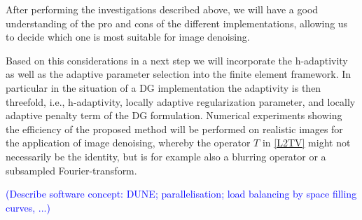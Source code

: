 \documentclass[enabledeprecatedfontcommands,cleardoublepage=empty,headsepline,twoside,11pt,DIV=15,BCOR=12mm,final]{scrartcl}
\begin{document}
  After performing the investigations described above, we will have a good understanding of the pro and cons of the different implementations, allowing us to decide which one is most suitable for image denoising. 

Based on this considerations in a next step we will incorporate the h-adaptivity as well as the adaptive parameter selection into the finite element framework. In particular in the situation of a DG implementation the adaptivity is then threefold, i.e., h-adaptivity, locally adaptive regularization parameter, and locally adaptive penalty term of the DG formulation. Numerical experiments showing the efficiency of the proposed method will be performed on realistic images for the application of image denoising, whereby the operator $T$ in \eqref{L2TV} might not necessarily be the identity, but is for example also a blurring operator or a subsampled Fourier-transform.

\textcolor{blue}{(Describe software concept: DUNE; parallelisation; load balancing by space filling curves, ...)}

  
 

 
%
% 
 
\end{document}
